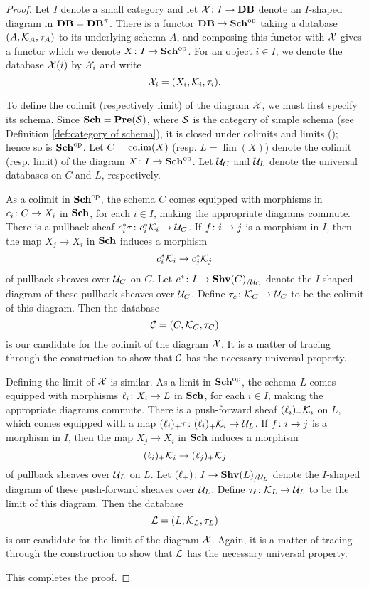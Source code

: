 \documentclass{amsart}
\begin{document}
\begin{proof}

Let $I$ denote a small category and let $\mathcal{X}\colon I\rightarrow{\bf DB}$ denote an $I$-shaped diagram in ${\bf DB}={\bf DB}^\pi$.  There is a functor ${\bf DB}\rightarrow{\bf Sch}^\textnormal{op}$ taking a database $(A,\mathcal{K}_A,\tau_A)$ to its underlying schema $A$, and composing this functor with $\mathcal{X}$ gives a functor which we denote $X\colon I\rightarrow{\bf Sch}^\textnormal{op}$.  For an object $i\in I$, we denote the database $\mathcal{X}(i)$ by $\mathcal{X}_i$ and write $$\mathcal{X}_i=(X_i,\mathcal{K}_i,\tau_i).$$

To define the colimit (respectively limit) of the diagram $\mathcal{X}$, we must first specify its schema.  Since ${\bf Sch}={\bf Pre}(\mathcal{S})$, where $\mathcal{S}$ is the category of simple schema (see Definition \ref{def:category of schema}), it is closed under colimits and limits (\cite[p. 22]{MM}); hence so is ${\bf Sch}^\textnormal{op}$.  Let $C=\mathop{\textnormal{colim}}(X)$ (resp. $L=\lim(X)$) denote the colimit (resp. limit) of the diagram $X\colon I\rightarrow{\bf Sch}^\textnormal{op}$.  Let $\mathcal{U}_C$ and $\mathcal{U}_L$ denote the universal databases on $C$ and $L$, respectively.

As a colimit in ${\bf Sch}^\textnormal{op}$, the schema $C$ comes equipped with morphisms in $c_i\colon C\rightarrow X_i$ in ${\bf Sch}$, for each $i\in I$, making the appropriate diagrams commute.  There is a pullback sheaf $c_i^*\tau\colon c_i^*\mathcal{K}_i\rightarrow\mathcal{U}_C$.  If $f\colon i\rightarrow j$ is a morphism in $I$, then the map $X_j\to X_i$ in ${\bf Sch}$ induces a morphism $$c_i^*\mathcal{K}_i\rightarrow c_j^*\mathcal{K}_j$$ of pullback sheaves over $\mathcal{U}_C$ on $C$.  Let $c^*\colon I\rightarrow{\bf Shv}(C)_{/\mathcal{U}_C}$ denote the $I$-shaped diagram of these pullback sheaves over $\mathcal{U}_C$.  Define $\tau_c\colon\mathcal{K}_C\rightarrow\mathcal{U}_C$ to be the colimit of this diagram.  Then the database $$\mathcal{C}=(C,\mathcal{K}_C,\tau_C)$$ is our candidate for the colimit of the diagram $\mathcal{X}$.  It is a matter of tracing through the construction to show that $\mathcal{C}$ has the necessary universal property.

Defining the limit of $\mathcal{X}$ is similar.  As a limit in ${\bf Sch}^\textnormal{op}$, the schema $L$ comes equipped with morphisms $\ell_i\colon X_i\rightarrow L$ in ${\bf Sch}$, for each $i\in I$, making the appropriate diagrams commute.  There is a push-forward sheaf $(\ell_i)_+\mathcal{K}_i$ on $L$, which comes equipped with a map $(\ell_i)_+\tau\colon(\ell_i)_+\mathcal{K}_i\rightarrow\mathcal{U}_L$.  If $f\colon i\rightarrow j$ is a morphism in $I$, then the map $X_j\to X_i$ in ${\bf Sch}$ induces a morphism $$(\ell_i)_+\mathcal{K}_i\rightarrow(\ell_j)_+\mathcal{K}_j$$ of pullback sheaves over $\mathcal{U}_L$ on $L$.  Let $(\ell_+)\colon I\rightarrow{\bf Shv}(L)_{/\mathcal{U}_L}$ denote the $I$-shaped diagram of these push-forward sheaves over $\mathcal{U}_L$.  Define $\tau_\ell\colon\mathcal{K}_L\rightarrow\mathcal{U}_L$ to be the limit of this diagram.  Then the database $$\mathcal{L}=(L,\mathcal{K}_L,\tau_L)$$ is our candidate for the limit of the diagram $\mathcal{X}$.  Again, it is a matter of tracing through the construction to show that $\mathcal{L}$ has the necessary universal property.  

This completes the proof.

\end{proof}
\end{document}
